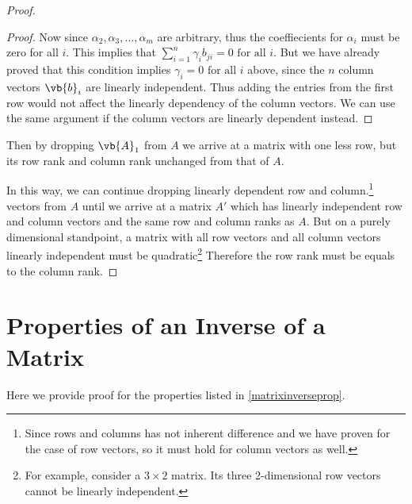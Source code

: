 \documentclass[a4paper,12pt]{report}
\begin{document}
\begin{appendices}
\begin{proof}
\begin{proof}
    Now since \(\alpha _{2}, \alpha _{3}, \ldots , \alpha _{m}\) are arbitrary, thus the coeffiecients for \(\alpha _{i} \) must be zero for all \(i\). This implies that \(\sum_{i=1}^{n} \gamma _{i} b_{ji} = 0 \text{ for all } i\). But we have already proved that this condition implies \(\gamma _{i} = 0 \text{ for all } i \) above, since the \(n\) column vectors \(\vb{b} _{i} \) are linearly independent. Thus adding the entries from the first row would not affect the linearly dependency of the column vectors. We can use the same argument if the column vectors are linearly dependent instead.
    \end{proof}
    
    Then by dropping \(\vb{A} _{1} \) from \(A\) we arrive at a matrix with one less row, but its row rank and column rank unchanged from that of \(A\).
        
    In this way, we can continue dropping linearly dependent row and column.\footnote{Since rows and columns has not inherent difference and we have proven for the case of row vectors, so it must hold for column vectors as well.}  vectors from \(A\) until we arrive at a matrix \(A'\) which has linearly independent row and column vectors and the same row and column ranks as \(A\). But on a purely dimensional standpoint, a matrix with all row vectors and all column vectors linearly independent must be quadratic\footnote{For example, consider a \(3 \times 2\) matrix. Its three 2-dimensional row vectors cannot be linearly independent.} Therefore the row rank must be equals to the column rank.
\end{proof}

\section{Properties of an Inverse of a Matrix} \label{matrixinversepropapp} 

Here we provide proof for the properties listed in \cref{matrixinverseprop}.


\end{appendices}
\end{document}
